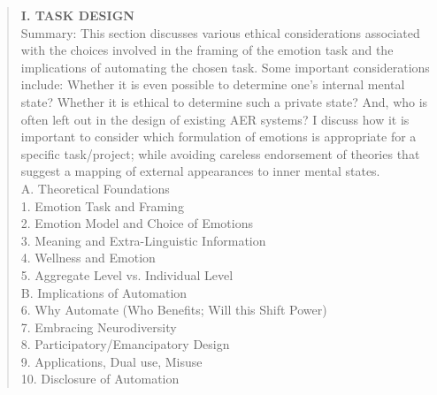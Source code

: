 \documentclass{clv3}
\begin{document}
\begin{quote}
    
\noindent \textbf{I. TASK DESIGN}\\[5pt]
\noindent Summary: This section discusses various ethical considerations associated with the choices involved in the framing of the emotion task and the implications of automating the chosen task. Some important considerations include: Whether it is even possible to determine one’s internal mental state? Whether it is ethical to determine such a private state? And, who is often left out in the design of existing AER systems? I discuss how it is important to consider which formulation of emotions is appropriate for a specific task/project; while avoiding careless endorsement of theories that suggest a mapping of external appearances to inner mental states.\\[5pt]
\noindent A. Theoretical Foundations\\[3pt]
\noindent \hspace*{3mm}   1. Emotion Task  and Framing\\
\hspace*{3mm}  2. Emotion Model and Choice of Emotions\\
\hspace*{3mm} 3. Meaning and Extra-Linguistic Information\\
\hspace*{3mm} 4. Wellness and Emotion\\
\hspace*{3mm} 5. Aggregate Level vs. Individual Level\\[3pt]
B. Implications of Automation\\[3pt]
\hspace*{3mm}  6. Why Automate (Who Benefits; Will this Shift Power)\\ 
\hspace*{3mm} 7. Embracing Neurodiversity\\
\hspace*{3mm} 8. Participatory/Emancipatory Design\\
\hspace*{3mm}  9. Applications, Dual use, Misuse\\
\hspace*{1.5mm}   10. Disclosure of Automation\\[3pt]
 

\end{quote}
\end{document}
